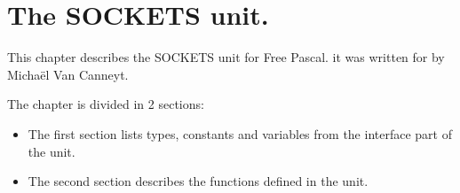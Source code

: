 %
%
%
%
%
\chapter{The SOCKETS unit.}
This chapter describes the SOCKETS unit for Free Pascal. 
it was written for \linux by Micha\"el Van Canneyt. 

The chapter is divided in 2 sections:
\begin{itemize}
\item The first section lists types, constants and variables from the
interface part of the unit.
\item The second section describes the functions defined in the unit.
\end{itemize}

